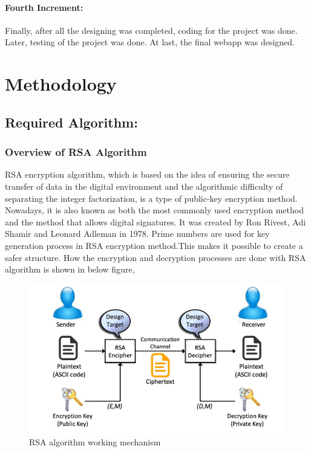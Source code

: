 \subsubsection{Fourth Increment:}
Finally, after all the designing was completed, coding for the project was done. Later,
testing of the project was done.
At last, the final webapp was designed.



\chapter{Methodology}

\section{Required Algorithm:}

\subsection{Overview of RSA Algorithm}
RSA encryption algorithm, which is based on the idea of ensuring the secure transfer of data in the digital environment and the algorithmic difficulty of separating the integer factorization, is a type of public-key encryption method. Nowadays, it is also known as both the most commonly used encryption method and the method that allows digital signatures. It was created by Ron Rivest, Adi Shamir and Leonard Adleman  in 1978. Prime numbers are used for key generation process in RSA encryption method.This makes it possible to create a safer structure. How the encryption and decryption processes
are done with RSA algorithm is shown in below figure,
\begin{figure}[H]
	\centering
	\includegraphics[width=160mm]{images/rsa algo.png}
	\caption{RSA algorithm working mechanism}
	\label{figdecisionalgo1} %
\end{figure}
\pagebreak

